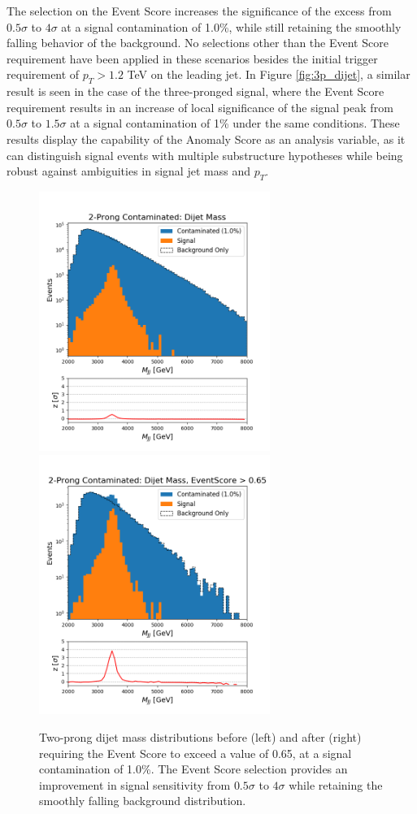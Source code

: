 \documentclass[11pt, a4paper]{article}
\begin{document}
The selection on the Event Score increases the significance of the excess from $0.5\sigma$ to $4\sigma$ at a signal contamination of 1.0\%, while still retaining the smoothly falling behavior of the background. No selections other than the Event Score requirement have been applied in these scenarios besides the initial trigger requirement of $p_{T} > 1.2$ TeV on the leading jet. In Figure \ref{fig:3p_dijet}, a similar result is seen in the case of the three-pronged signal, where the Event Score requirement results in an increase of local significance of the signal peak from $0.5\sigma$ to $1.5\sigma$ at a signal contamination of 1\% under the same conditions. These results display the capability of the Anomaly Score as an analysis variable, as it can distinguish signal events with multiple substructure hypotheses while being robust against ambiguities in signal jet mass and $p_{T}$.

\begin{figure}[H]
	\begin{center}
		\includegraphics[width=213pt]{imgs/bugfix/2Prong_Contaminated_1p0_JJ_Mass_Multi_SaveForPaper_Lead.png}
		\includegraphics[width=213pt]{imgs/bugfix/2Prong_Contaminated_1p0_JJ_Mass_EventScore0p65_Multi_SaveForPaper_Lead.png}
	\end{center}
	\caption{Two-prong dijet mass distributions before (left) and after (right) requiring the Event Score to exceed a value of 0.65, at a signal contamination of 1.0\%. The Event Score selection provides an improvement in signal sensitivity from $0.5\sigma$ to $4\sigma$ while retaining the smoothly falling background distribution.}
	\label{fig:2p_dijet}
\end{figure}
\end{document}
